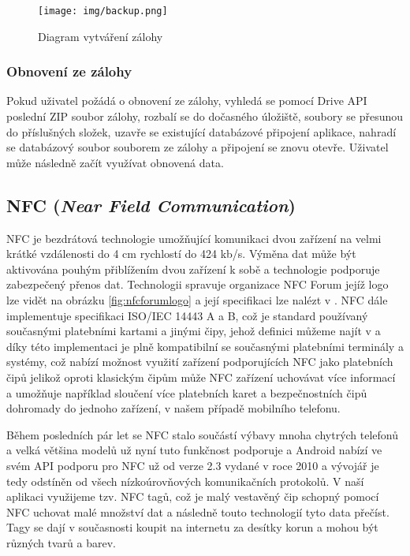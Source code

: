 \documentclass[czech,master,public,dept460,male,java,cpdeclaration]{diploma}
\begin{document}
\begin{figure}[H]
        \centering
                \texttt{[image: img/backup.png]}
        \caption{Diagram vytváření zálohy}
        \label{fig:backup}
\end{figure}

\subsubsection{Obnovení ze zálohy}
Pokud uživatel požádá o obnovení ze zálohy, vyhledá se pomocí Drive API poslední ZIP soubor zálohy,
rozbalí se do dočasného úložiště, soubory se přesunou do příslušných složek, uzavře se existující
databázové připojení aplikace, nahradí se databázový soubor souborem ze zálohy a připojení se znovu otevře.
Uživatel může následně začít využívat obnovená data.

\subsection{NFC (\textit{Near Field Communication})}
NFC je bezdrátová technologie umožňující komunikaci dvou zařízení na velmi krátké vzdálenosti do 4 cm
rychlostí do 424 kb/s.\cite{nfcforum}  Výměna dat může být aktivována pouhým přiblížením dvou zařízení k sobě
a technologie podporuje zabezpečený přenos dat. Technologii spravuje organizace NFC Forum jejíž logo lze vidět
na obrázku \ref{fig:nfcforumlogo} a její specifikaci lze nalézt v \cite{nfciso}.
NFC dále implementuje specifikaci ISO/IEC 14443 A a B\cite{nfcforum}, což je standard používaný
současnými platebními kartami a jinými čipy, jehož definici můžeme najít v \cite{rfidiso} a díky této
implementaci je plně kompatibilní se současnými platebními terminály a systémy, což nabízí možnost využití zařízení
podporujících NFC jako platebních čipů jelikož oproti klasickým čipům může NFC zařízení uchovávat více informací
a umožňuje například sloučení více platebních karet a bezpečnostních čipů dohromady do jednoho zařízení,
v našem případě mobilního telefonu.

Během posledních pár let se NFC stalo součástí výbavy mnoha chytrých telefonů a velká většina modelů
už nyní tuto funkčnost podporuje a Android nabízí ve svém API podporu pro NFC už od verze 2.3
vydané v roce 2010 a vývojář je tedy odstíněn od všech nízkoúrovňových komunikačních protokolů.
V naší aplikaci využijeme tzv. NFC tagů, což je malý vestavěný čip schopný pomocí NFC uchovat malé množství dat a
následně touto technologií tyto data přečíst. Tagy se dají v současnosti koupit na internetu za desítky
korun a mohou být různých tvarů a barev.
\end{document}
